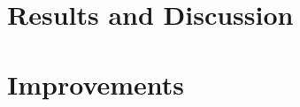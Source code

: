 \documentclass[draft,final]{vutinfth} %
\begin{document}
\chapter{Results and Discussion}



\chapter{Improvements}


\backmatter

\begin{aitools}
\end{aitools}

\begin{kitools}
\end{kitools}

\listoffigures %

\cleardoublepage %
\listoftables %


\printindex

\printglossaries



\end{document}
